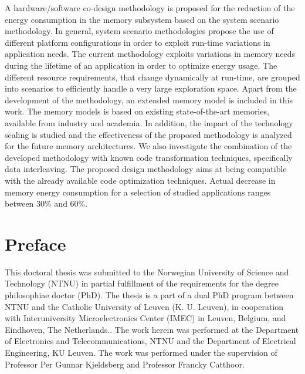 A hardware/software co-design methodology is proposed for the reduction of the energy consumption in the memory subsystem based on the system scenario methodology.
In general, system scenario methodologies propose the use of different platform configurations in order to exploit run-time variations in application needs.
The current methodology exploits variations in memory needs during the lifetime of an application in order to optimize energy usage. 
The different resource requirements, that change dynamically at run-time, are grouped into scenarios to efficiently handle a very large exploration space.
Apart from the development of the methodology, an extended memory model is included in this work. 
The memory models is based on existing state-of-the-art memories, available from industry and academia.
In addition, the impact of the technology scaling is studied and the effectiveness of the proposed methodology is analyzed for the future memory architectures.
We also investigate the combination of the developed methodology with known code transformation techniques, specifically data interleaving.
The proposed design methodology aims at being compatible with the already available code optimization techniques.
Actual decrease in memory energy consumption for a selection of studied applications ranges between 30\% and 60\%. 
\afterpage{\null\newpage}
\newpage


\vspace*{\fill}
\section*{\Huge Preface }
\bigskip
\bigskip
This doctoral thesis was submitted to the Norwegian University of Science and Technology (NTNU) in partial fulfillment of the requirements for the degree philosophiae doctor (PhD). 
The thesis is a part of a dual PhD program between NTNU and the Catholic University of Leuven (K. U. Leuven), in cooperation with Interuniversity Microelectronics Center (IMEC) in Leuven, Belgium, and Eindhoven, The Netherlands..
The work herein was performed at the Department of Electronics and Telecommunications, NTNU and the Department of Electrical Engineering, KU Leuven.
The work was performed under the supervision of Professor Per Gunnar Kjeldsberg and Professor Francky Catthoor.

